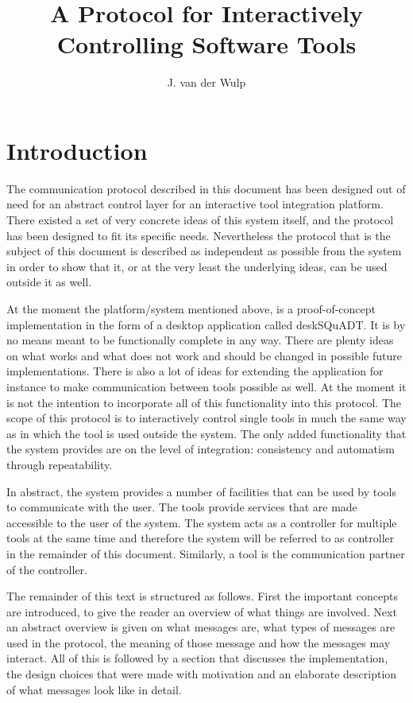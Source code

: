 \documentclass{article}
\title{A Protocol for Interactively Controlling Software Tools}
\author{J. van der Wulp}
\begin{document}
\maketitle

 \section{Introduction}

  The communication protocol described in this document has been designed out
  of need for an abstract control layer for an interactive tool integration
  platform. There existed a set of very concrete ideas of this system itself,
  and the protocol has been designed to fit its specific needs. Nevertheless
  the protocol that is the subject of this document is described as independent
  as possible from the system in order to show that it, or at the very least
  the underlying ideas, can be used outside it as well.

  At the moment the platform/system mentioned above, is a proof-of-concept
  implementation in the form of a desktop application called deskSQuADT. It is
  by no means meant to be functionally complete in any way. There are plenty
  ideas on what works and what does not work and should be changed in possible
  future implementations.  There is also a lot of ideas for extending the
  application for instance to make communication between tools possible as
  well. At the moment it is not the intention to incorporate all of this
  functionality into this protocol. The scope of this protocol is to
  interactively control single tools in much the same way as in which the tool
  is used outside the system.  The only added functionality that the system
  provides are on the level of integration: consistency and automatism through
  repeatability.

  In abstract, the system provides a number of facilities that can be used by
  tools to communicate with the user. The tools provide services that are made
  accessible to the user of the system. The system acts as a controller for
  multiple tools at the same time and therefore the system will be referred to
  as controller in the remainder of this document. Similarly, a tool is the
  communication partner of the controller.

  The remainder of this text is structured as follows. First the important
  concepts are introduced, to give the reader an overview of what things are
  involved. Next an abstract overview is given on what messages are, what types
  of messages are used in the protocol, the meaning of those message and how
  the messages may interact. All of this is followed by a section that
  discusses the implementation, the design choices that were made with
  motivation and an elaborate description of what messages look like in detail.
\end{document}
